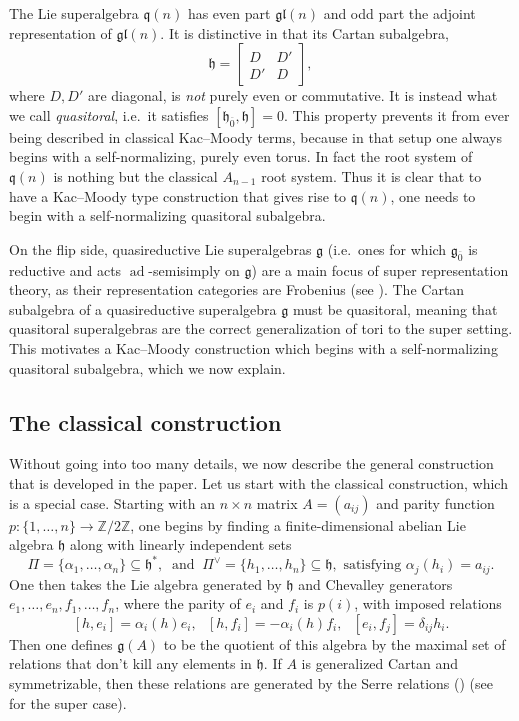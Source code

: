 \documentclass[12pt, a4paper, reqno]{amsart}
\def\Z{\mathbb{Z}}
\def\q{\mathfrak{q}}
\def\g{\mathfrak{g}}
\def\h{\mathfrak{h}}
\def\l{\mathfrak{l}}
\def\ol{\overline}
\theoremstyle{definition}
\theoremstyle{definition}
\theoremstyle{definition}
\numberwithin{theorem}{section}
\numberwithin{lemma}{section}
\numberwithin{remark}{section}
\numberwithin{definition}{section}
\numberwithin{corollary}{section}
\numberwithin{proposition}{section}
\numberwithin{example}{section}
\begin{document}
	The Lie superalgebra $\q(n)$ has even part $\g\l(n)$ and odd part the adjoint representation of $\g\l(n)$.  It is distinctive in that its Cartan subalgebra, 
	\[
	\h=\begin{bmatrix}
		D & D'\\ D' & D
	\end{bmatrix},
	\]
	where $D,D'$ are diagonal, is \emph{not} purely even or commutative.  It is instead what we call \emph{quasitoral}, i.e.~it satisfies $[\h_{\ol{0}},\h]=0$.  This property prevents it from ever being described in classical Kac--Moody terms, because in that setup one always begins with a self-normalizing, purely even torus.  In fact the root system of $\q(n)$ is nothing but the classical $A_{n-1}$ root system.   Thus it is clear that to have a Kac--Moody type construction that gives rise to $\q(n)$, one needs to begin with a self-normalizing quasitoral subalgebra.
	
	On the flip side, quasireductive Lie superalgebras $\g$ (i.e.~ones for which $\g_{\ol{0}}$ is reductive and acts $\operatorname{ad}$-semisimply on $\g$) are a main focus of super representation theory, as their representation categories are Frobenius (see \cite{S2}).  The Cartan subalgebra of a quasireductive superalgebra $\g$ must be quasitoral, meaning that quasitoral superalgebras are the correct generalization of tori to the super setting.  This motivates a Kac--Moody construction which begins with a self-normalizing quasitoral subalgebra, which we now explain.
	
	\subsection{The classical construction} Without going into too many details, we now describe the general construction that is developed in the paper.  Let us start with the classical construction, which is a special case.  Starting with an $n\times n$ matrix $A=(a_{ij})$ and parity function $p:\{1,\dots,n\}\to\Z/2\Z$, one begins by finding a finite-dimensional abelian Lie algebra $\h$ along with linearly independent sets 
	\[
	\Pi=\{\alpha_1,\dots,\alpha_n\}\subseteq\h^*, \ \text{ and } \ \Pi^\vee=\{h_1,\dots,h_n\}\subseteq\h, \text{ satisfying } \alpha_j(h_i)=a_{ij}.
	\]
	One then takes the Lie algebra generated by $\h$ and Chevalley generators $e_1,\dots,e_n,f_1,\dots,f_n$, where the parity of $e_i$ and $f_i$ is $p(i)$, with imposed relations
	\[
	[h,e_{i}]=\alpha_i(h)e_i, \ \ \ [h,f_i]=-\alpha_i(h)f_i, \ \ \ [e_i,f_j]=\delta_{ij}h_i.
	\]
	Then one defines $\g(A)$ to be the quotient of this algebra by the maximal set of relations that don't kill any elements in $\h$.  If $A$ is generalized Cartan and symmetrizable, then these relations are generated by the Serre relations (\cite{GK}) (see \cite{LS} for the super case).
	
\end{document}
